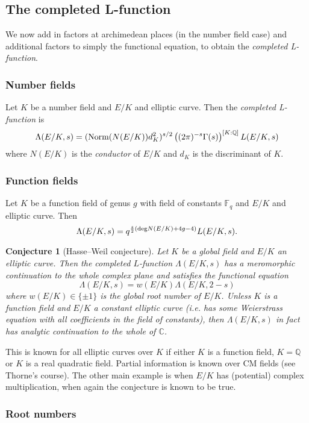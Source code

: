 \documentclass[12pt]{amsart}
\numberwithin{equation}{section}
\newtheorem{conjecture}{Conjecture}
\theoremstyle{remark}
\theoremstyle{definition}
\theoremstyle{definition}
\theoremstyle{definition}
\theoremstyle{definition}
\theoremstyle{definition}
\theoremstyle{definition}
\theoremstyle{definition}
\begin{document}
\subsection{The completed L-function}

We now add in factors at archimedean places (in the number field case) and additional factors to simply the functional equation, to obtain the \textit{completed L-function}. 

\subsubsection{Number fields} Let $K$ be a number field and $E/K$ and elliptic curve. Then the \textit{completed L-function} is
\[\Lambda(E/K,s)=(\textup{Norm}(N(E/K))d_K^2)^{s/2}\left((2\pi)^{-s}\Gamma(s)\right)^{[K:\mathbb{Q}]}L(E/K,s)\]
where $N(E/K)$ is the \textit{conductor} of $E/K$ and $d_K$ is the discriminant of $K$.


\subsubsection{Function fields} Let $K$ be a function field of genus $g$ with field of constants $\mathbb{F}_q$ and $E/K$ and elliptic curve. 
Then 
\[\Lambda(E/K,s)=q^{\frac{s}{2}(\textup{deg}N(E/K)+4g-4)}L(E/K,s).\]

\begin{conjecture}[Hasse--Weil conjecture]
Let $K$ be a global field and $E/K$ an elliptic curve. Then the completed $L$-function $\Lambda(E/K,s)$ has a meromorphic continuation to the whole complex plane and satisfies the functional equation \[\Lambda(E/K,s)=w(E/K)\Lambda(E/K,2-s)\]
where $w(E/K)\in \{\pm 1\}$ is the \textit{global root number} of $E/K$. Unless $K$ is a function field and $E/K$ a constant elliptic curve (i.e. has some Weierstrass equation with all coefficients in the field of constants), then $\Lambda(E/K,s)$ in fact has analytic continuation to the whole of $\mathbb{C}$. 
\end{conjecture}

This is known for all elliptic curves over $K$ if either $K$ is a function field, $K=\mathbb{Q}$ or $K$ is a real quadratic field. Partial information is known over CM fields (see Thorne's course). The other main example is when $E/K$ has (potential) complex multiplication, when again the conjecture is known to be true. 

\subsubsection{Root numbers}
\end{document}
